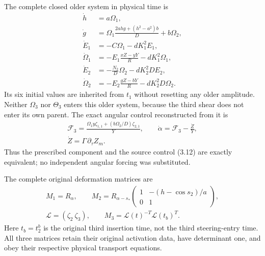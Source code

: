 The complete closed older system in physical time is
\begin{equation}\label{cvlane:tr:closed}
 \begin{aligned}
 \dot h&=a\Omega_1,\\
 \dot g&=\Omega_1\frac{2ahg+(h^2-a^2)b}{D}+b\Omega_2,\\
 \dot E_1&=-C\Omega_1-dK_1^2E_1,\\
 \dot\Omega_1&=-E_1\frac{xZ-yY}{R}-dK_1^2\Omega_1,\\
 \dot E_2&=-\frac{N_2}{D}\Omega_2-dK_2^2DE_2,\\
 \dot\Omega_2&=-E_2\frac{gZ-bY}{R}-dK_2^2D\Omega_2.
 \end{aligned}
\end{equation}
Its six initial values are inherited from $t_1$ without resetting any
older amplitude. Neither $\Omega_3$ nor $\Theta_3$ enters this
older system, because the third shear does not enter its own parent.
The exact angular control reconstructed from it is
\begin{equation}\label{cvlane:tr:control}
 \begin{gathered}
 \mathcal F_3=
 \frac{\Omega_1y\zeta_{1,1}+(b\Omega_2/D)\zeta_{2,1}}{Y},
 \qquad
 \dot\alpha=\mathcal F_3-\frac{\dot Z}{Y},\\
 \dot Z=\Gamma\,\partial_\tau Z_m.
 \end{gathered}
\end{equation}
Thus the prescribed component and the source control (3.12) are
exactly equivalent; no independent angular forcing was substituted.

The complete original deformation matrices are
\begin{equation}\label{cvlane:tr:matrices}
 \begin{gathered}
 M_1=R_\alpha,\qquad
 M_2=R_{\alpha-s_*}
 \begin{pmatrix}1&-(h-\cos s_2)/a\\0&1\end{pmatrix},\\
 \mathcal L=(\zeta_2\ \zeta_3),\qquad
 M_3=\mathcal L(t)^{-T}\mathcal L(t_b)^T.
 \end{gathered}
\end{equation}
Here $t_b=t_2^b$ is the original third insertion time, not the
third steering-entry time. All three matrices retain their original
activation data, have determinant one, and obey their respective
physical transport equations.


